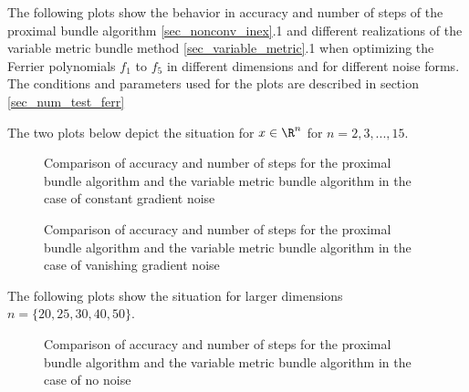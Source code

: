 The following plots show the behavior in accuracy and number of steps of the proximal bundle algorithm \ref{sec_nonconv_inex}.1 and different realizations of the variable metric bundle method \ref{sec_variable_metric}.1 when optimizing the Ferrier polynomials \(f_1\) to \(f_5\) in different dimensions and for different noise forms.
The conditions and parameters used for the plots are described in section \ref{sec_num_test_ferr}

The two plots below depict the situation for \(x \in \R^n\) for \(n = 2,3,...,15\).

\begin{figure}[H]
	\begin{subfigure}{0.49\textwidth}
	\end{subfigure}
	\begin{subfigure}{0.49\textwidth}
	\end{subfigure}
	\caption{Comparison of accuracy and number of steps for the proximal bundle algorithm and the variable metric bundle algorithm in the case of constant gradient noise}%
	\label{fig_const_grad_noise}%
\end{figure}

\vspace{-1.5em}

\begin{figure}[H]
	\begin{subfigure}{0.49\textwidth}
	\end{subfigure}
	\begin{subfigure}{0.49\textwidth}
	\end{subfigure}
	\caption{Comparison of accuracy and number of steps for the proximal bundle algorithm and the variable metric bundle algorithm in the case of vanishing gradient noise}%
	\label{fig_van_grad_noise}%
\end{figure}


The following plots show the situation for larger dimensions \(n = \{20,25,30,40,50\}\).


\begin{figure}[H]%
	\begin{subfigure}{0.49\textwidth}
	\end{subfigure}
	\begin{subfigure}{0.49\textwidth}
	\end{subfigure}
	\caption{Comparison of accuracy and number of steps for the proximal bundle algorithm and the variable metric bundle algorithm in the case of no noise}
	\label{fig_no_noise_large}

\end{figure}

